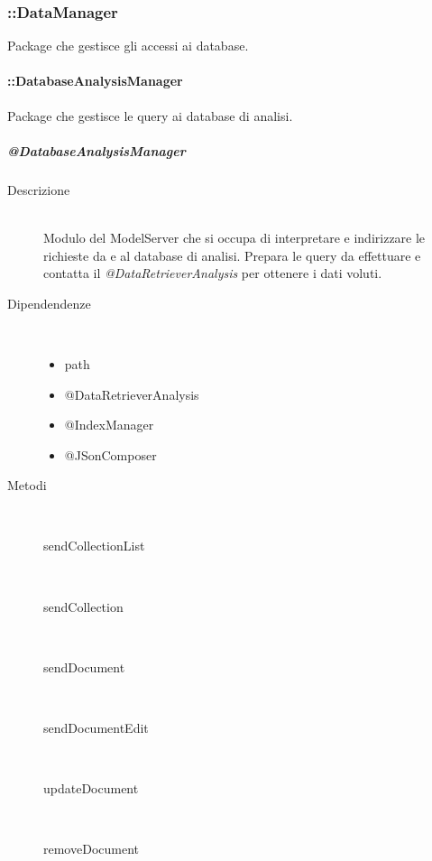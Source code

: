 \subsubsection{::DataManager}
Package che gestisce gli accessi ai database.

\paragraph{::DatabaseAnalysisManager}
Package che gestisce le query ai database di analisi. 

\subparagraph{@DatabaseAnalysisManager}

\begin{description}
 \item[Descrizione] \hfill \\
Modulo del ModelServer che si occupa di interpretare e indirizzare le richieste da e al database di analisi. 
Prepara le query da effettuare e contatta il \textit{@DataRetrieverAnalysis} per ottenere i dati voluti.
 \item[Dipendendenze] \hfill \\
 \begin{itemize}
  \item{path}
  \item{@DataRetrieverAnalysis}
  \item{@IndexManager}
  \item{@JSonComposer}
 \end{itemize}
  
 \item[Metodi] \hfill \\
 \begin{description}
 \item[sendCollectionList] \hfill \\
 \item[sendCollection] \hfill \\
 \item[sendDocument] \hfill \\
 \item[sendDocumentEdit] \hfill \\
 \item[updateDocument] \hfill \\
 \item[removeDocument] \hfill \\
 \end{description}
 
\end{description}


